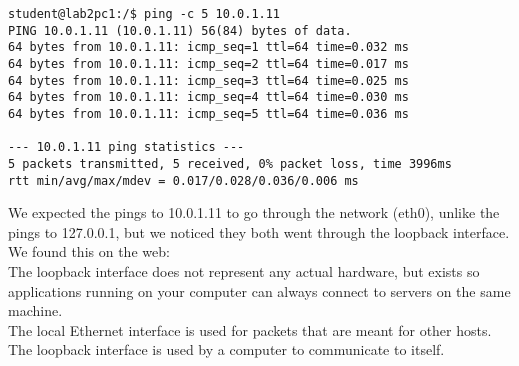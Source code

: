 \begin{lstlisting}
student@lab2pc1:/$ ping -c 5 10.0.1.11
PING 10.0.1.11 (10.0.1.11) 56(84) bytes of data.
64 bytes from 10.0.1.11: icmp_seq=1 ttl=64 time=0.032 ms
64 bytes from 10.0.1.11: icmp_seq=2 ttl=64 time=0.017 ms
64 bytes from 10.0.1.11: icmp_seq=3 ttl=64 time=0.025 ms
64 bytes from 10.0.1.11: icmp_seq=4 ttl=64 time=0.030 ms
64 bytes from 10.0.1.11: icmp_seq=5 ttl=64 time=0.036 ms

--- 10.0.1.11 ping statistics ---
5 packets transmitted, 5 received, 0% packet loss, time 3996ms
rtt min/avg/max/mdev = 0.017/0.028/0.036/0.006 ms
\end{lstlisting}

We expected the pings to 10.0.1.11 to go through the network (eth0), unlike the pings to 127.0.0.1, but we noticed they both went through the loopback interface.\\ 
We found this on the web:\\
    The loopback interface does not represent any actual hardware, 
    but exists so applications running on your computer can always connect 
    to servers on the same machine.\\

The local Ethernet interface is used for packets that are meant for other hosts.\\
The loopback interface is used by a computer to communicate to itself.